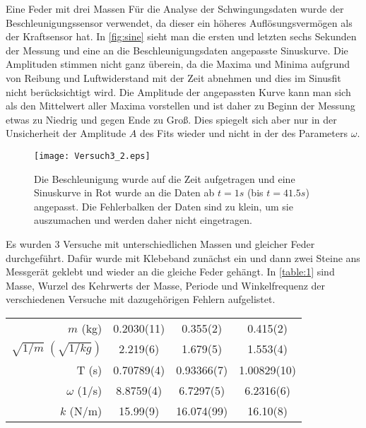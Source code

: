 \documentclass{alex_gp}
\begin{document}
\begin{mybox}{Eine Feder mit drei Massen}
	Für die Analyse der Schwingungsdaten wurde der Beschleunigungssensor verwendet, da dieser ein höheres Auflösungsvermögen als der Kraftsensor hat. In \autoref{fig:sine} sieht man die ersten und letzten sechs Sekunden der Messung und eine an die Beschleunigungsdaten angepasste Sinuskurve. Die Amplituden stimmen nicht ganz überein, da die Maxima und Minima aufgrund von Reibung und Luftwiderstand mit der Zeit abnehmen und dies im Sinusfit nicht berücksichtigt wird. Die Amplitude der angepassten Kurve kann man sich als den Mittelwert aller Maxima vorstellen und ist daher zu Beginn der Messung etwas zu Niedrig und gegen Ende zu Groß. Dies spiegelt sich aber nur in der Unsicherheit der Amplitude \( A \) des Fits wieder und nicht in der des Parameters \( \omega \).
	
	\begin{figure}[H]
		\centering
		\texttt{[image: Versuch3\_2.eps]}
		\caption{Die Beschleunigung wurde auf die Zeit aufgetragen und eine Sinuskurve in Rot wurde an die Daten ab \( t = 1 \unit{s} \) (bis \( t = 41.5 \unit{s} \)) angepasst. Die Fehlerbalken der Daten sind zu klein, um sie auszumachen und werden daher nicht eingetragen.}
		\label{fig:sine}
	\end{figure}
	
		Es wurden 3 Versuche mit unterschiedlichen Massen und gleicher Feder durchgeführt. Dafür wurde mit Klebeband zunächst ein und dann zwei Steine ans Messgerät geklebt und wieder an die gleiche Feder gehängt. In \autoref{table:1} sind Masse, Wurzel des Kehrwerts der Masse, Periode und Winkelfrequenz der verschiedenen Versuche mit dazugehörigen Fehlern aufgelistet. \par
	\begin{center}
		\begin{tabular}{@{\extracolsep{5mm}} 
				r
				S[table-format=1.5(1)]
				S[table-format=1.5(1)]
				S[table-format=1.5(1)]
			}
			\toprule
			\makecell[t]{}
			&   {}
			&   {}
			&   {}\\
			\midrule
			\( m \) (kg) & 0.2030(11) & 0.355(2) & 0.415(2) \\
			\( \sqrt{1/m}\; (\sqrt{1/\unit{kg}}) \) & 2.219(6) & 1.679(5) & 1.553(4) \\
			T (s) & 0.70789(4) & 0.93366(7) & 1.00829(10) \\
			$\omega$ (1/s) & 8.8759(4) & 6.7297(5) & 6.2316(6) \\
			\( k \) (N/m) & 15.99(9) & 16.074(99) & 16.10(8) \\
			\bottomrule
		\end{tabular}
	\label{table:1}
	\end{center}


\end{mybox}
\end{document}
